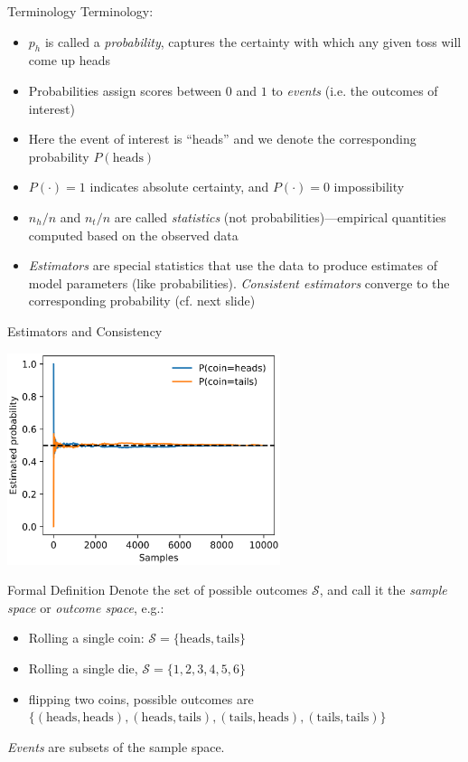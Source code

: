 {\begin{frame}{Terminology}
        Terminology:
        \begin{itemize}
            \item $p_h$ is called a \emph{probability}, captures the certainty with which any given toss will come up heads
            \item Probabilities assign scores between $0$ and $1$ to \emph{events} (i.e. the outcomes of interest)
            \item Here the event of interest is ``heads'' and we denote the corresponding probability $P(\text{heads})$
            \item $P(\cdot) = 1$ indicates absolute certainty, and $P(\cdot) = 0$ impossibility
            \item $n_h / n$ and $n_t / n$ are called \emph{statistics} (not probabilities)---empirical quantities
                  computed based on the observed data
            \item \emph{Estimators} are special statistics that use the data to produce estimates of model parameters (like probabilities).
                  \emph{Consistent estimators} converge to the corresponding probability (cf. next slide)
        \end{itemize}
    \end{frame}

    \begin{frame}
        \vspace*{5mm}
        Estimators and Consistency
        \begin{center}
            \includegraphics[width=0.6\textwidth]{fig/prob_estimator_convergence.eps}
        \end{center}
    \end{frame}

    \begin{frame}{Formal Definition}
        Denote the set of possible outcomes $\mathcal{S}$, and call it the \emph{sample space} or \emph{outcome space}, e.g.:
        \begin{itemize}
            \item Rolling a single coin: $\mathcal{S} = \{\textrm{heads}, \textrm{tails}\}$
            \item Rolling a single die, $\mathcal{S} = \{1, 2, 3, 4, 5, 6\}$
            \item flipping two coins, possible outcomes are
                  $\{(\textrm{heads}, \textrm{heads}), (\textrm{heads}, \textrm{tails}), (\textrm{tails}, \textrm{heads}),  (\textrm{tails}, \textrm{tails})\}$
        \end{itemize}
        \emph{Events} are subsets of the sample space.


\end{frame}}
